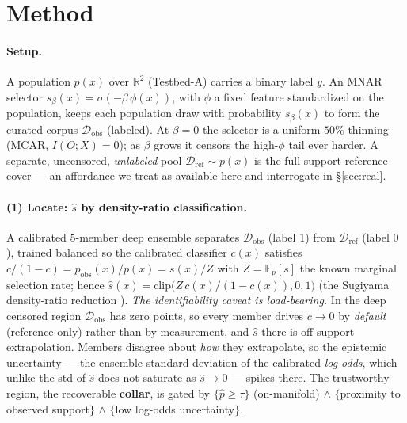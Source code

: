 \documentclass[10pt]{article}
\newcommand{\E}{\mathbb{E}}
\newcommand{\R}{\mathbb{R}}
\newcommand{\shat}{\hat s}
\newcommand{\phat}{\hat p}
\newcommand{\Dobs}{\mathcal{D}_{\mathrm{obs}}}
\newcommand{\Dref}{\mathcal{D}_{\mathrm{ref}}}
\newcommand{\IOX}{I(O;X)}
\begin{document}
\section{Method}
\label{sec:method}

\paragraph{Setup.} A population $p(x)$ over $\R^2$ (Testbed-A) carries a binary
label $y$. An MNAR selector $s_\beta(x)=\sigma(-\beta\,\phi(x))$, with $\phi$ a
fixed feature standardized on the population, keeps each population draw with
probability $s_\beta(x)$ to form the curated corpus $\Dobs$ (labeled). At
$\beta{=}0$ the selector is a uniform $50\%$ thinning (MCAR, $\IOX{=}0$); as
$\beta$ grows it censors the high-$\phi$ tail ever harder. A separate,
uncensored, \emph{unlabeled} pool $\Dref\sim p(x)$ is the full-support reference
cover --- an affordance we treat as available here and interrogate in
\S\ref{sec:real}.

\paragraph{(1) Locate: $\shat$ by density-ratio classification.}
A calibrated $5$-member deep ensemble separates $\Dobs$ (label $1$) from $\Dref$
(label $0$), trained balanced so the calibrated classifier $c(x)$ satisfies
$c/(1-c)=p_{\mathrm{obs}}(x)/p(x)=s(x)/Z$ with $Z=\E_p[s]$ the known marginal
selection rate; hence $\shat(x)=\mathrm{clip}\!\big(Z\,c(x)/(1-c(x)),0,1\big)$
(the Sugiyama density-ratio reduction \citep{sugiyama2012}). \emph{The
identifiability caveat is load-bearing.} In the deep censored region $\Dobs$ has
zero points, so every member drives $c\!\to\!0$ by \emph{default} (reference-only)
rather than by measurement, and $\shat$ there is off-support extrapolation.
Members disagree about \emph{how} they extrapolate, so the epistemic uncertainty
--- the ensemble standard deviation of the calibrated \emph{log-odds}, which
unlike the std of $\shat$ does not saturate as $\shat\!\to\!0$ --- spikes there.
The trustworthy region, the recoverable \textbf{collar}, is gated by
$\{\phat\!\ge\!\tau\}$ (on-manifold) $\wedge$ $\{$proximity to observed
support$\}$ $\wedge$ $\{$low log-odds uncertainty$\}$.
\end{document}
